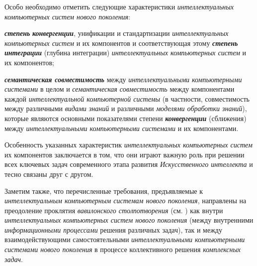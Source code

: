 Особо необходимо отметить следующие характеристики \textit{интеллектуальных компьютерных систем нового поколения}:
\begin{textitemize}
	\item \textbf{\textit{степень}} \textbf{\textit{конвергенции}}, унификации и стандартизации \textit{интеллектуальных компьютерных систем} и их компонентов и соответствующая этому \textbf{\textit{степень интеграции}} (глубина интеграции) \textit{интеллектуальных компьютерных систем} и их компонентов;
	\item \textbf{\textit{семантическая совместимость}} между \textit{интеллектуальными компьютерными системами} в целом и \textit{семантическая совместимость} между компонентами каждой \textit{интеллектуальной компьютерной системы} (в частности, совместимость между различными \textit{видами знаний} и различными \textit{моделями обработки знаний}), которые являются основными показателями степени \textbf{\textit{конвергенции}} (сближения) между \textit{интеллектуальными компьютерными системами} и их компонентами.
\end{textitemize}

Особенность указанных характеристик \textit{интеллектуальных компьютерных систем} их компонентов заключается в том, что они играют важную роль при решении всех ключевых задач современного этапа развития \textit{Искусственного интеллекта} и тесно связаны друг с другом.

Заметим также, что перечисленные требования, предъявляемые к \textit{интеллектуальным компьютерным системам нового поколения}, направлены на преодоление проклятия \textit{вавилонского столпотворения} (см. ) как внутри \textit{интеллектуальных компьютерных систем нового поколения} (между внутренними \textit{информационными процессами} решения различных задач), так и между взаимодействующими самостоятельными \textit{интеллектуальными компьютерными системами нового поколения} в процессе коллективного решения \textit{комплексных задач}.

